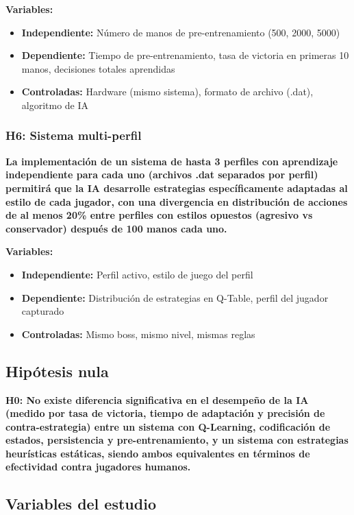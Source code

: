 \documentclass[12pt,a4paper]{article}
\begin{document}
\textbf{Variables:}
\begin{itemize}
    \item \textbf{Independiente:} Número de manos de pre-entrenamiento (500, 2000, 5000)
    \item \textbf{Dependiente:} Tiempo de pre-entrenamiento, tasa de victoria en primeras 10 manos, decisiones totales aprendidas
    \item \textbf{Controladas:} Hardware (mismo sistema), formato de archivo (.dat), algoritmo de IA
\end{itemize}

\subsubsection{H6: Sistema multi-perfil}

\textbf{La implementación de un sistema de hasta 3 perfiles con aprendizaje independiente para cada uno (archivos .dat separados por perfil) permitirá que la IA desarrolle estrategias específicamente adaptadas al estilo de cada jugador, con una divergencia en distribución de acciones de al menos 20\% entre perfiles con estilos opuestos (agresivo vs conservador) después de 100 manos cada uno.}

\textbf{Variables:}
\begin{itemize}
    \item \textbf{Independiente:} Perfil activo, estilo de juego del perfil
    \item \textbf{Dependiente:} Distribución de estrategias en Q-Table, perfil del jugador capturado
    \item \textbf{Controladas:} Mismo boss, mismo nivel, mismas reglas
\end{itemize}

\subsection{Hipótesis nula}

\textbf{H0: No existe diferencia significativa en el desempeño de la IA (medido por tasa de victoria, tiempo de adaptación y precisión de contra-estrategia) entre un sistema con Q-Learning, codificación de estados, persistencia y pre-entrenamiento, y un sistema con estrategias heurísticas estáticas, siendo ambos equivalentes en términos de efectividad contra jugadores humanos.}

\subsection{Variables del estudio}
\end{document}
